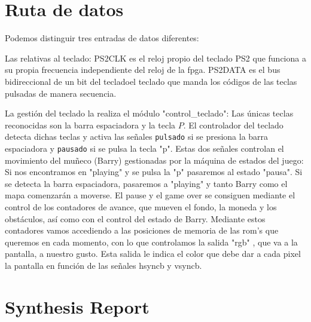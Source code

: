 \documentclass[11pt, a4paper, spanish, openright, twoside]{book}
\begin{document}
\newpage
\mbox{}
\thispagestyle{empty}						%
\newpage


\tableofcontents 							%

\newpage


\vspace{3cm}


\section{Ruta de datos}
	Podemos distinguir tres entradas de datos diferentes:
	\begin{itemize}	Las relativas al teclado: PS2CLK es el reloj propio del teclado PS2 que funciona a  su propia frecuencia independiente 
 	del reloj de la fpga. PS2DATA es el bus bidireccional de un bit del tecladoel teclado que manda los códigos de las teclas pulsadas de manera secuencia.
	
	La gestión del teclado la realiza el módulo "control\_teclado":	Las únicas teclas reconocidas son la barra espaciadora y la tecla $P$. El controlador del teclado detecta dichas teclas y activa las señales \texttt{pulsado} si se presiona la barra espaciadora y \texttt{pausado} si se pulsa la tecla "p".	
	Estas dos señales controlan el movimiento del muñeco (Barry) gestionadas por la máquina de estados del juego: Si nos encontramos en "playing" y se pulsa la "p"  pasaremos al estado "pausa". Si se detecta la barra espaciadora, pasaremos
	 a "playing" y tanto Barry como el mapa comenzarán a moverse. El pause y el game over se consiguen mediante el control de los contadores de avance, que mueven el fondo, la moneda y los obstáculos, así como con el control del estado de Barry.
	Mediante estos contadores vamos accediendo a las posiciones de memoria de las rom's que queremos en cada momento, con lo que controlamos la salida "rgb" , que va a la pantalla, a nuestro gusto. Esta salida le indica el color que debe dar a cada pixel
	 la pantalla en función de las señales hsyncb y vsyncb.
\end{itemize}

\section{Synthesis Report}
\end{document}
